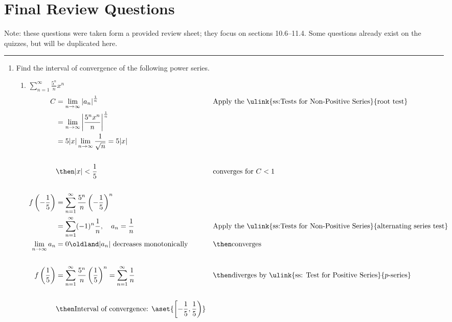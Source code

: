 \chapter{Final Review Questions}

Note: these questions were taken form a provided review sheet;
they focus on sections 10.6--11.4. Some questions already exist on the
quizzes, but will be duplicated here.
\vspace{-2pt}
\hrule
\vspace{10pt}

\begin{enumerate}
  \item Find the interval of convergence of the following power series.

  \begin{enumerate}[itemsep=24em]
    \item \(\displaystyle \sum_{n=1}^{\infty} \frac{5^n}{n}x^n \)
      \begin{align*}
      C &= \lim_{n \to \infty} \left| a_n  \right|^{\frac{1}{n}}
           && \text{Apply the \ulink{ss:Tests for Non-Positive Series}{root test}} \\
           &= \lim_{n \to \infty}  \left|
           \frac{5^nx^n}{n}
          \right|^{\frac{1}{n}}  \\
           &= 5|x| \lim_{n \to \infty}  \frac{1}{\sqrt{n}} = 5|x| \\
           \\
           &\then |x| < \frac{1}{5}
           && \text{converges for } C <1 \\
           \\
           f\left(- \frac{1}{5}\right)
           &= \sum_{n=1}^{\infty}  \frac{5^n}{n}\left(-\frac{1}{5}\right)^n \\
           &= \sum_{n=1}^{\infty} (-1)^n \frac{1}{n}, \quad a_n = \frac{1}{n}
           && \text{Apply the \ulink{ss:Tests for Non-Positive Series}{alternating series test}} \\
           \lim_{n \to \infty} a_n &= 0 \oldland
           |a_n|~\text{decreases monotonically}
                                   &&\then \text{converges} \\
                                   \\
           f\left(\frac{1}{5}\right)
           &= \sum_{n=1}^{\infty}  \frac{5^n}{n}\left(\frac{1}{5}\right)^n
           = \sum_{n=1}^{\infty} \frac{1}{n}
           && \then \text{diverges by \ulink{ss: Test for Positive Series}{\(p\)-series}} \\
           \\
           &\then \text{Interval of convergence: } \aset{\left[-\frac{1}{5}, \frac{1}{5}\right)}
    \end{align*}


\end{enumerate}
\end{enumerate}
